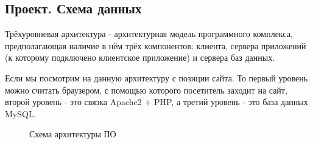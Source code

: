 \subsection{Проект. Схема данных}

Трёхуровневая архитектура - архитектурная модель программного комплекса, предполагающая наличие в нём трёх компонентов: клиента, сервера приложений (к которому подключено клиентское приложение) и сервера баз данных.

Если мы посмотрим на данную архитектуру с позиции сайта. То первый уровень можно считать браузером, с помощью которого посетитель заходит на сайт, второй уровень - это связка Apache2 + PHP, а третий уровень - это база данных MySQL.

\begin{figure}[!htp]
    \caption{Схема архитектуры ПО}
    \label{fig:layoyt}
\end{figure}
